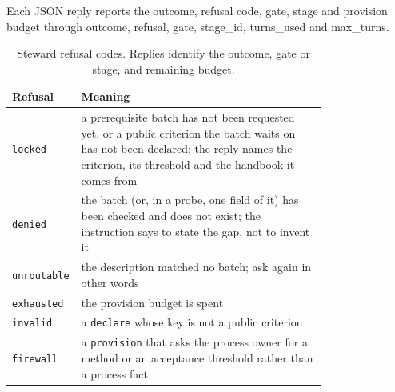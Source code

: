 \documentclass{article}
\begin{document}
Each JSON reply reports the outcome, refusal code, gate, stage and provision budget through {outcome}, {refusal}, {gate}, {stage\_id}, {turns\_used} and {max\_turns}.

\begin{table}[!htbp]
\caption{Steward refusal codes. Replies identify the outcome, gate or stage, and remaining budget.}
\label{tab:refusals}
\centering
\footnotesize
\begin{tabular}{@{}lP{0.78\linewidth}@{}}
\toprule
Refusal & Meaning \\
\midrule
\texttt{locked}     & a prerequisite batch has not been requested yet, or a public criterion the batch waits on has not been declared; the reply names the criterion, its threshold and the handbook it comes from \\
\texttt{denied}     & the batch (or, in a probe, one field of it) has been checked and does not exist; the instruction says to state the gap, not to invent it \\
\texttt{unroutable} & the description matched no batch; ask again in other words \\
\texttt{exhausted}  & the provision budget is spent \\
\texttt{invalid}    & a \texttt{declare} whose key is not a public criterion \\
\texttt{firewall}   & a \texttt{provision} that asks the process owner for a method or an acceptance threshold rather than a process fact \\
\bottomrule
\end{tabular}

\end{table}
\end{document}
